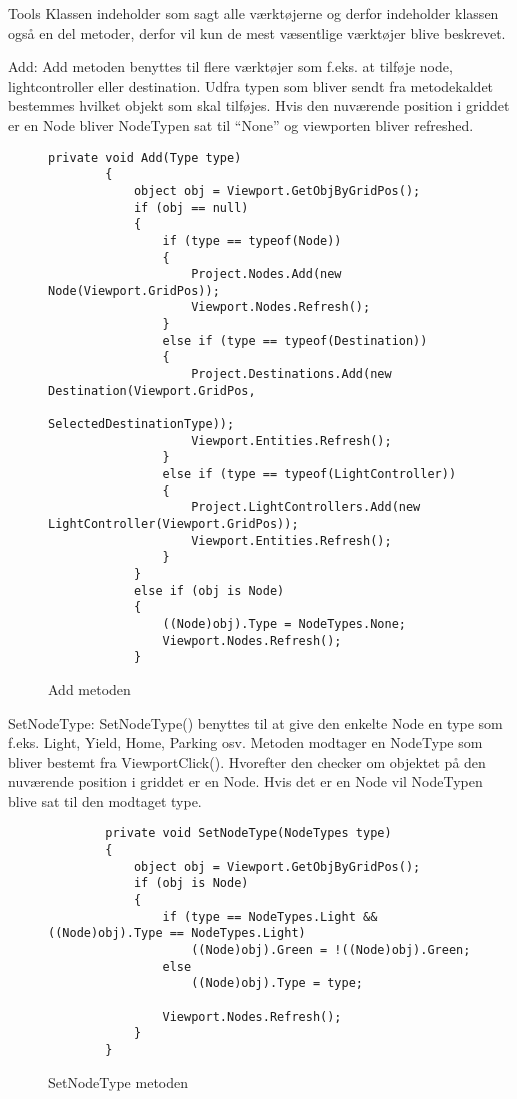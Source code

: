 \vspace{5mm}

Tools
Klassen indeholder som sagt alle værktøjerne og derfor indeholder klassen også en del metoder, derfor vil kun de mest væsentlige værktøjer blive beskrevet.

\vspace{5mm}

Add:
Add metoden benyttes til flere værktøjer som f.eks. at tilføje node, lightcontroller eller destination. Udfra typen som bliver sendt fra metodekaldet bestemmes hvilket objekt som skal tilføjes. Hvis den nuværende position i griddet er en Node bliver NodeTypen sat til “None” og viewporten bliver refreshed. 

\begin{figure}[H]
\begin{lstlisting}
private void Add(Type type)
        {
            object obj = Viewport.GetObjByGridPos();
            if (obj == null)
            {
                if (type == typeof(Node))
                {
                    Project.Nodes.Add(new Node(Viewport.GridPos));
                    Viewport.Nodes.Refresh();
                }
                else if (type == typeof(Destination))
                {
                    Project.Destinations.Add(new Destination(Viewport.GridPos,  
		                            SelectedDestinationType));
                    Viewport.Entities.Refresh();
                }
                else if (type == typeof(LightController))
                {
                    Project.LightControllers.Add(new LightController(Viewport.GridPos));
                    Viewport.Entities.Refresh();
                }
            }
            else if (obj is Node)
            {
                ((Node)obj).Type = NodeTypes.None;
                Viewport.Nodes.Refresh();
            }
\end{lstlisting}
\caption{Add metoden}\label{AddCode}
\end{figure}

\vspace{5mm}

SetNodeType:
SetNodeType() benyttes til at give den enkelte Node en type som f.eks. Light, Yield, Home, Parking osv. Metoden modtager en NodeType som bliver bestemt fra ViewportClick(). Hvorefter den checker om objektet på den nuværende position i griddet er en Node. Hvis det er en Node vil NodeTypen blive sat til den modtaget type.

\begin{figure}[H]
\begin{lstlisting}
        private void SetNodeType(NodeTypes type)
        {
            object obj = Viewport.GetObjByGridPos();
            if (obj is Node)
            {
                if (type == NodeTypes.Light && ((Node)obj).Type == NodeTypes.Light)
                    ((Node)obj).Green = !((Node)obj).Green;
                else
                    ((Node)obj).Type = type;

                Viewport.Nodes.Refresh();
            }
        }
\end{lstlisting}
\caption{SetNodeType metoden}\label{SetNodeTypeCode}
\end{figure}
